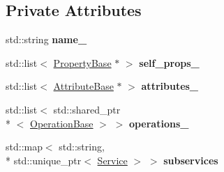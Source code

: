 \subsection*{Private Attributes}
\begin{DoxyCompactItemize}
\item 
\hypertarget{classcoco_1_1_service_ab7810b45fabd24c1283e094b8cddb0a9}{std\-::string {\bfseries name\-\_\-}}\label{classcoco_1_1_service_ab7810b45fabd24c1283e094b8cddb0a9}

\item 
\hypertarget{classcoco_1_1_service_a4768940688dbbba11e14c7050408f1e4}{std\-::list$<$ \hyperlink{classcoco_1_1_property_base}{Property\-Base} $\ast$ $>$ {\bfseries self\-\_\-props\-\_\-}}\label{classcoco_1_1_service_a4768940688dbbba11e14c7050408f1e4}

\item 
\hypertarget{classcoco_1_1_service_acf0302a1ecebd340409e502dbdeedc8c}{std\-::list$<$ \hyperlink{classcoco_1_1_attribute_base}{Attribute\-Base} $\ast$ $>$ {\bfseries attributes\-\_\-}}\label{classcoco_1_1_service_acf0302a1ecebd340409e502dbdeedc8c}

\item 
\hypertarget{classcoco_1_1_service_afd71b579afddad23873f5e8571e8cbd3}{std\-::list$<$ std\-::shared\-\_\-ptr\\*
$<$ \hyperlink{classcoco_1_1_operation_base}{Operation\-Base} $>$ $>$ {\bfseries operations\-\_\-}}\label{classcoco_1_1_service_afd71b579afddad23873f5e8571e8cbd3}

\item 
\hypertarget{classcoco_1_1_service_aa5d690793bdea13dbc7e79898f0aa5db}{std\-::map$<$ std\-::string, \\*
std\-::unique\-\_\-ptr$<$ \hyperlink{classcoco_1_1_service}{Service} $>$ $>$ {\bfseries subservices}}\label{classcoco_1_1_service_aa5d690793bdea13dbc7e79898f0aa5db}

\end{DoxyCompactItemize}
